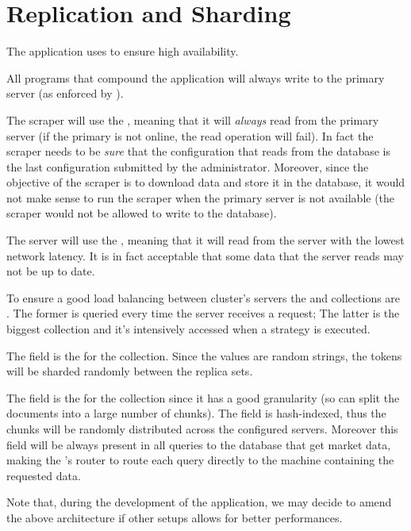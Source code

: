 \section{Replication and Sharding}\label{sec:distributed}

The application uses  to ensure high availability.

All programs that compound the application will always write to the primary
server (as enforced by \mongodb).

The scraper will use the  ,
meaning that it will \emph{always} read from the primary server (if the primary
is not online, the read operation will fail). In fact the scraper needs to be
\emph{sure} that the configuration that reads from the database is the last
configuration submitted by the administrator. Moreover, since the objective of
the scraper is to download data and store it in the database, it would not make
sense to run the scraper when the primary server is not available (the scraper
would not be allowed to write to the database).

The server will use the  ,
meaning that it will read from the server with the lowest network latency. It is
in fact acceptable that some data that the server reads may not be up to date.

To ensure a good load balancing between cluster's servers the 
and  collections are . The former is queried
every time the server receives a request; The latter is the biggest collection
and it's intensively accessed when a strategy is executed.

The  field is the  for the 
collection. Since the values are random strings, the tokens will be sharded
randomly between the replica sets.

The  field is the  for the 
collection since it has a good granularity (so \mongodb{} can split the
documents into a large number of chunks). The field is hash-indexed, thus the
chunks will be randomly distributed across the configured servers. Moreover this
field will be always present in all queries to the database that get market
data, making the \mongodb's router to route each query directly to the machine
containing the requested data.

Note that, during the development of the application, we may decide to amend the
above architecture if other setups allows for better performances.
